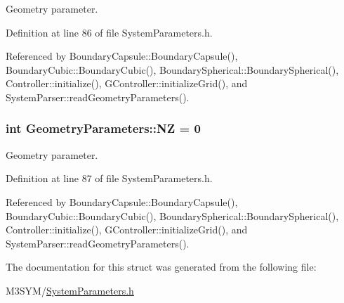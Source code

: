 Geometry parameter. 



Definition at line 86 of file System\+Parameters.\+h.



Referenced by Boundary\+Capsule\+::\+Boundary\+Capsule(), Boundary\+Cubic\+::\+Boundary\+Cubic(), Boundary\+Spherical\+::\+Boundary\+Spherical(), Controller\+::initialize(), G\+Controller\+::initialize\+Grid(), and System\+Parser\+::read\+Geometry\+Parameters().

\hypertarget{structGeometryParameters_a01890a89021cabfc92ee2b8e23faef60}{
\subsubsection[{N\+Z}]{\setlength{\rightskip}{0pt plus 5cm}int Geometry\+Parameters\+::\+N\+Z = 0}}\label{structGeometryParameters_a01890a89021cabfc92ee2b8e23faef60}


Geometry parameter. 



Definition at line 87 of file System\+Parameters.\+h.



Referenced by Boundary\+Capsule\+::\+Boundary\+Capsule(), Boundary\+Cubic\+::\+Boundary\+Cubic(), Boundary\+Spherical\+::\+Boundary\+Spherical(), Controller\+::initialize(), G\+Controller\+::initialize\+Grid(), and System\+Parser\+::read\+Geometry\+Parameters().



The documentation for this struct was generated from the following file\+:\begin{DoxyCompactItemize}
\item 
M3\+S\+Y\+M/\hyperlink{SystemParameters_8h}{System\+Parameters.\+h}\end{DoxyCompactItemize}
